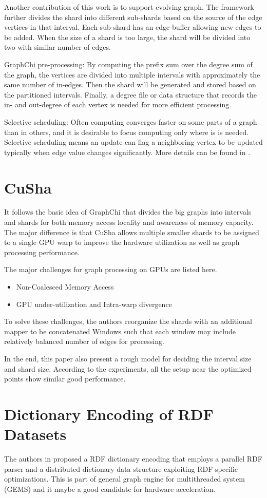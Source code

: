 Another contribution of this work is to support evolving graph. The framework further
divides the shard into different sub-shards based on the source of the edge
vertices in that interval. Each sub-shard has an edge-buffer allowing new edges
to be added. When the size of a shard is too large, the shard will be divided
into two with similar number of edges.

GraphChi pre-processing: By computing the prefix sum over the degree sum of the
graph, the vertices are divided into multiple intervals with approximately the
same number of in-edges. Then the shard will be generated and stored based on
the partitioned intervals. Finally, a degree file or data structure that records
the in- and out-degree of each vertex is needed for more efficient processing.

Selective scheduling: Often computing converges faster on some parts of a graph
than in others, and it is desirable to focus computing only where is is needed.
Selective scheduling means an update can flag a neighboring vertex to be updated
typically when edge value changes significantly. More details can be found in
\cite{cheng2012kineograph}.

\section{CuSha}
It follows the basic idea of GraphChi that divides the big graphs into intervals
and shards for both memory access locality and awareness of memory capacity. The
major difference is that CuSha \cite{Khorasani2014CuSha} allows multiple smaller shards to be assigned to
a single GPU warp to improve the hardware utilization as well as graph
processing performance. 

The major challenges for graph processing on GPUs are listed here.
\begin{itemize}
    \item Non-Coalesced Memory Access
    \item GPU under-utilization and Intra-warp divergence
\end{itemize}
To solve these challenges, the authors reorganize the shards with an additional
mapper to be concatenated Windows such that each window may include relatively
balanced number of edges for processing.

In the end, this paper also present a rough model for deciding the interval size
and shard size. According to the experiments, all the setup near the optimized
points show similar good performance.

\section{Dictionary Encoding of RDF Datasets}
The authors in \cite{morari2015high} proposed a RDF dictionary encoding that employs a parallel RDF
parser and a distributed dictionary data structure exploiting RDF-specific
optimizations. This is part of general graph engine for multithreaded system
(GEMS) and it maybe a good candidate for hardware acceleration.

